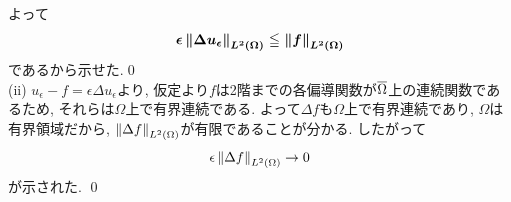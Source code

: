 よって
\[{\mbox{\boldmath $\epsilon\left\| \Delta u_{\epsilon} \right\|_{L^2(\Omega)} \leqq \left\| f \right\|_{L^2(\Omega)}$}}\]
であるから示せた.\qed \\
(ii) $u_{\epsilon} - f = \epsilon \Delta u_{\epsilon}$より,
仮定より$f$は2階までの各偏導関数が$\overline{\Omega}$上の連続関数であるため, それらは$\Omega$上で有界連続である. よって$\Delta f$も$\Omega$上で有界連続であり, $\Omega$は有界領域だから,  $\left\| \Delta f \right\|_{L^2(\Omega)}$が有限であることが分かる. したがって
\[\epsilon \left\| \Delta f \right\|_{L^2(\Omega)} \to 0\]
が示された. \qed
